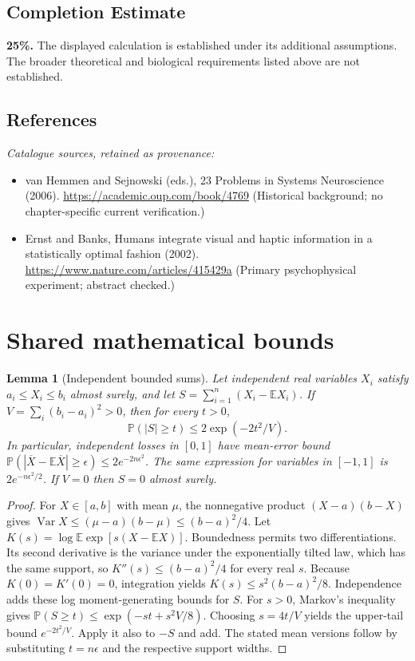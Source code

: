 \documentclass[11pt]{article}
\newcommand{\E}{\mathbb E}
\newcommand{\Prob}{\mathbb P}
\DeclareMathOperator{\Var}{Var}
\providecommand{\E}{\mathbb E}
\providecommand{\Prob}{\mathbb P}
\providecommand{\Var}{\operatorname{Var}}
\newtheorem{sharedlemma}{Lemma}[section]
\begin{document}
\subsection{Completion Estimate}
\textbf{25\%.} The displayed calculation is established under its additional assumptions. The broader theoretical and biological requirements listed above are not established.
\subsection{References}
\noindent\emph{Catalogue sources, retained as provenance:}
\begin{itemize}
\item van Hemmen and Sejnowski (eds.), 23 Problems in Systems Neuroscience (2006). \url{https://academic.oup.com/book/4769} (Historical background; no chapter-specific current verification.)
\item Ernst and Banks, Humans integrate visual and haptic information in a statistically optimal fashion (2002). \url{https://www.nature.com/articles/415429a} (Primary psychophysical experiment; abstract checked.)
\end{itemize}
\clearpage


\appendix
\section{Shared mathematical bounds}\label{app:bounds}
\begin{sharedlemma}[Independent bounded sums]\label{lem:bounded}
Let independent real variables $X_i$ satisfy $a_i\leq X_i\leq b_i$ almost surely,
and let $S=\sum_{i=1}^n(X_i-\E X_i)$. If
$V=\sum_i(b_i-a_i)^2>0$, then for every $t>0$,
\[
 \Prob(|S|\geq t)\leq 2\exp(-2t^2/V).
\]
In particular, independent losses in $[0,1]$ have mean-error bound
$\Prob(|\overline X-\E\overline X|\geq\epsilon)
\leq2e^{-2n\epsilon^2}$. The same expression for variables in $[-1,1]$
is $2e^{-n\epsilon^2/2}$. If $V=0$ then $S=0$ almost surely.
\end{sharedlemma}
\begin{proof}
For $X\in[a,b]$ with mean $\mu$, the nonnegative product
$(X-a)(b-X)$ gives
$\Var X\leq(\mu-a)(b-\mu)\leq(b-a)^2/4$.
Let $K(s)=\log\E\exp[s(X-\E X)]$.
Boundedness permits two differentiations. Its second derivative is the variance
under the exponentially tilted law, which has the same support, so
$K''(s)\leq(b-a)^2/4$ for every real $s$.
Because $K(0)=K'(0)=0$, integration yields
$K(s)\leq s^2(b-a)^2/8$.
Independence adds these log moment-generating bounds for $S$.
For $s>0$, Markov's inequality gives
$\Prob(S\geq t)\leq\exp(-st+s^2V/8)$.
Choosing $s=4t/V$ yields the upper-tail bound $e^{-2t^2/V}$.
Apply it also to $-S$ and add. The stated mean versions follow by substituting
$t=n\epsilon$ and the respective support widths.
\end{proof}
\end{document}
